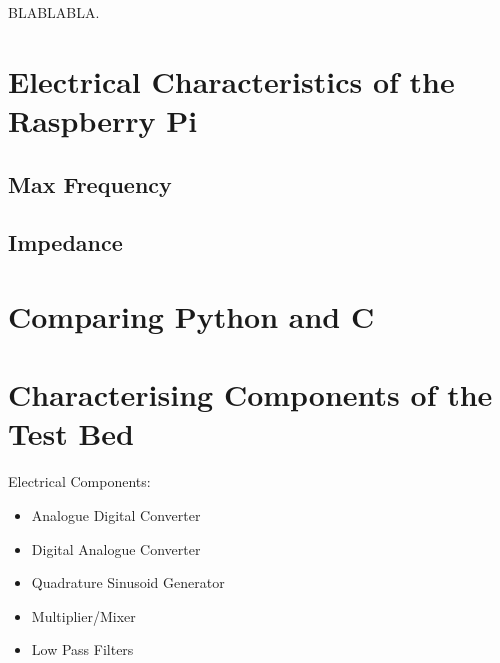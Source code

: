 \documentclass[../main.tex]{subfiles}
\begin{document}
BLABLABLA.


\section{Electrical Characteristics of the Raspberry Pi}
\subsection{Max Frequency}
\subsection{Impedance}


\section{Comparing Python and C}


\section{Characterising Components of the Test Bed}

Electrical Components:
\begin{itemize}
	\item Analogue Digital Converter
	\item Digital Analogue Converter
	\item Quadrature Sinusoid Generator
	\item Multiplier/Mixer
	\item Low Pass Filters
\end{itemize}
\end{document}
